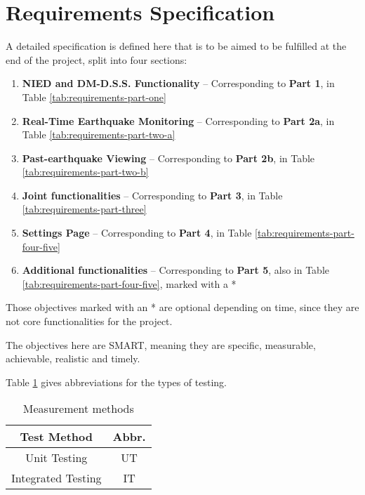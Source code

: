 \section{Requirements Specification}

A detailed specification is defined here that is to be aimed to be fulfilled at the end of the project, split into four sections:
\begin{enumerate}
    \item \textbf{NIED and DM-D.S.S. Functionality} -- Corresponding to \textbf{Part 1}, in Table \ref{tab:requirements-part-one}
    \item \textbf{Real-Time Earthquake Monitoring} -- Corresponding to \textbf{Part 2a}, in Table \ref{tab:requirements-part-two-a}
    \item \textbf{Past-earthquake Viewing} -- Corresponding to \textbf{Part 2b}, in Table \ref{tab:requirements-part-two-b}
    \item \textbf{Joint functionalities} -- Corresponding to \textbf{Part 3}, in Table \ref{tab:requirements-part-three}
    \item \textbf{Settings Page} -- Corresponding to \textbf{Part 4}, in Table \ref{tab:requirements-part-four-five}
    \item \textbf{Additional functionalities} -- Corresponding to \textbf{Part 5}, also in Table \ref{tab:requirements-part-four-five}, marked with a *
\end{enumerate}

Those objectives marked with an * are optional depending on time, since they are not core functionalities for the project.

The objectives here are SMART, meaning they are specific, measurable, achievable, realistic and timely.

Table \ref{tab:abbrs} gives abbreviations for the types of testing.

\begin{table}[htp]
    \centering
    \begin{tabular}{cc}
        Test Method        & Abbr. \\
        \hline
        Unit Testing       & UT    \\
        Integrated Testing & IT    \\
    \end{tabular}
    \caption{Measurement methods}
    \label{tab:abbrs}
\end{table}

